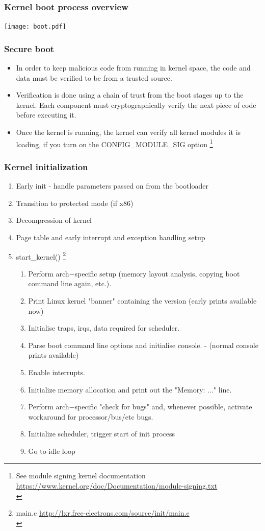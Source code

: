 \documentclass{beamer}
\begin{document}
\begin{frame}
\frametitle{Kernel boot process overview}
\texttt{[image: boot.pdf]}
\end{frame}

\begin{frame}
\frametitle{Secure boot}
\begin{itemize}
	\item In order to keep malicious code from running in kernel space, the code and data must be verified to be from a trusted source.
	\item Verification is done using a chain of trust from the boot stages up to the kernel. Each component must cryptographically verify the next piece of code before executing it.
	\item Once the kernel is running, the kernel can verify all kernel modules it is loading, if you turn on the CONFIG\_MODULE\_SIG option \footnote{See module signing kernel documentation \url{https://www.kernel.org/doc/Documentation/module-signing.txt}\\}
\end{itemize}
\end{frame}

\begin{frame}
\frametitle{Kernel initialization}
\begin{enumerate}
	\item Early init - handle parameters passed on from the bootloader 
	\item Transition to protected mode (if x86)
	\item Decompression of kernel
	\item Page table and early interrupt and exception handling setup
	\item start\_kernel() \footnote{main.c \url{http://lxr.free-electrons.com/source/init/main.c} \\}
	\begin{enumerate}
		\item Perform arch−specific setup (memory layout analysis, copying boot command line again, etc.).
		\item Print Linux kernel "banner" containing the version  (early prints available now)
		\item Initialise traps, irqs, data required for scheduler.
		\item Parse boot command line options and initialise console. - (normal console prints available)
		\item Enable interrupts.
		\item Initialize memory allocation and print out the "Memory: ..." line.
		\item Perform arch−specific "check for bugs" and, whenever possible, activate workaround for processor/bus/etc bugs.
		\item Initialize scheduler, trigger start of init process
		\item Go to idle loop
	\end{enumerate}
\end{enumerate}
\end{frame}
\end{document}
